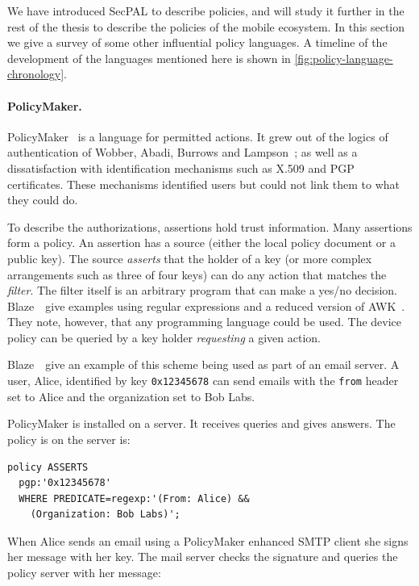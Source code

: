\documentclass[thesis.tex]{subfiles}
\begin{document}
We have introduced SecPAL to describe policies, and will study it further in the
rest of the thesis to describe the policies of the mobile ecosystem. In this
section we give a survey of some other influential policy languages. A timeline
of the development of the languages mentioned here is shown in
\autoref{fig:policy-language-chronology}.

\paragraph*{PolicyMaker.}  PolicyMaker~\cite{blaze_decentralized_1996}
is a language for permitted actions.  It grew out of the logics of
authentication of Wobber, Abadi, Burrows and
Lampson~\cite{wobber_authentication_1994,abadi_calculus_1991}; as well
as a dissatisfaction with identification mechanisms such as X.509 and
PGP certificates. These mechanisms identified users but could not link
them to what they could do.

To describe the authorizations, assertions hold trust information.
Many assertions form a policy. An assertion has a source (either the
local policy document or a public key). The source \emph{asserts} that
the holder of a key (or more complex arrangements such as three of
four keys) can do any action that matches the \emph{filter}. The
filter itself is an arbitrary program that can make a yes/no decision.
Blaze~\etal~give examples using regular expressions and a reduced
version of AWK~\cite{aho_awk-pattern_1979}. They note, however, that
any programming language could be used. The device policy can be
queried by a key holder \emph{requesting} a given action.

Blaze~\etal~give an example of this scheme being used as part of an
email server. A user, Alice, identified by key \texttt{0x12345678} can
send emails with the \texttt{from} header set to Alice and the
organization set to Bob Labs.

PolicyMaker is installed on a server. It receives queries and gives answers.
The policy is on the server is:

\begin{lstlisting}
policy ASSERTS
  pgp:'0x12345678'
  WHERE PREDICATE=regexp:'(From: Alice) &&
    (Organization: Bob Labs)';
\end{lstlisting}

When Alice sends an email using a PolicyMaker enhanced SMTP
client she signs her message with her key.  The mail server
checks the signature and queries the policy server with her message:
\end{document}
